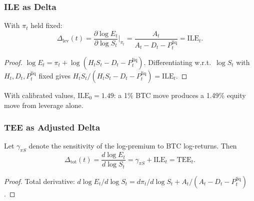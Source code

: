 \subsubsection{ILE as Delta}

\begin{proposition}\label{prop:ile_delta}
  With $\pi_t$ held fixed:
  \begin{equation}
    \Delta_{\mathrm{lev}}(t)
    = \frac{\partial \log E_t}{\partial \log S_t}\bigg|_{\pi_t}
    = \frac{A_t}{A_t - D_t - P_t^{\mathrm{liq}}}
    = \mathrm{ILE}_t.
  \end{equation}
\end{proposition}

\begin{proof}
  $\log E_t = \pi_t + \log(H_tS_t - D_t - P_t^{\mathrm{liq}})$.
  Differentiating w.r.t.\ $\log S_t$ with $H_t, D_t, P_t^{\mathrm{liq}}$
  fixed gives $H_tS_t / (H_tS_t - D_t - P_t^{\mathrm{liq}}) = \mathrm{ILE}_t$.
\end{proof}

With calibrated values, $\mathrm{ILE}_0 = 1.49$: a 1\% BTC move produces a
1.49\% equity move from leverage alone.

\subsubsection{TEE as Adjusted Delta}

\begin{proposition}\label{prop:tee_delta}
  Let $\gamma_{\pi S}$ denote the sensitivity of the log-premium to BTC
  log-returns.  Then
  \begin{equation}
    \Delta_{\mathrm{tot}}(t)
    = \frac{d\log E_t}{d\log S_t}
    = \gamma_{\pi S} + \mathrm{ILE}_t
    = \mathrm{TEE}_t.
  \end{equation}
\end{proposition}

\begin{proof}
  Total derivative: $d\log E_t / d\log S_t = d\pi_t/d\log S_t + A_t/(A_t - D_t - P_t^{\mathrm{liq}})$.
\end{proof}

